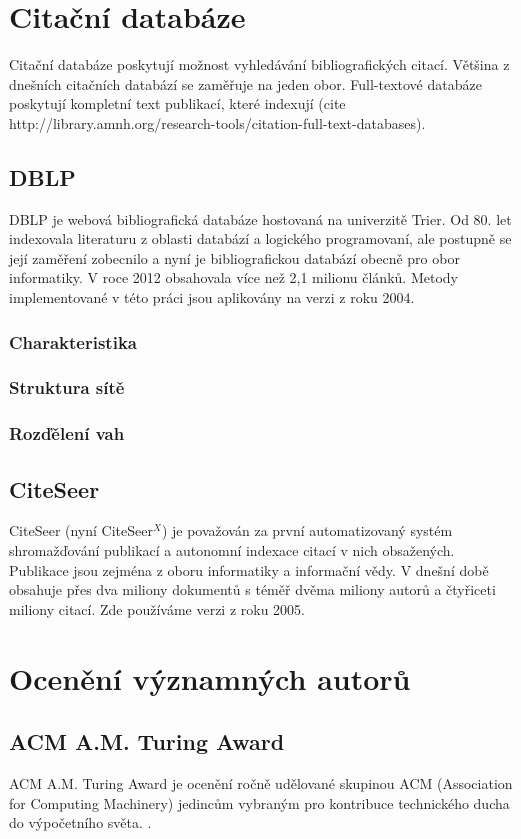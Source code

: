\documentclass[12pt,titlepage]{report}
\begin{document}
\section{Citační databáze}
Citační databáze poskytují možnost vyhledávání bibliografických citací. Většina
z dnešních citačních databází se zaměřuje na jeden obor. Full-textové databáze
poskytují kompletní text publikací, které indexují (cite
http://library.amnh.org/research-tools/citation-full-text-databases).

\subsection{DBLP}
DBLP \cite{DBLP} je webová bibliografická databáze hostovaná na univerzitě
Trier. Od 80.  let indexovala literaturu z oblasti databází a logického
programovaní, ale postupně se její zaměření zobecnilo a nyní je bibliografickou
databází obecně pro obor informatiky. V roce 2012 obsahovala více než 2,1
milionu článků. Metody implementované v této práci jsou aplikovány na verzi z
roku 2004. 

\subsubsection{Charakteristika}
\subsubsection{Struktura sítě}
\subsubsection{Rozďělení vah}

\subsection{CiteSeer}
CiteSeer (nyní CiteSeer$^X$) \cite{citeseer} je považován za první
automatizovaný systém shromažďování publikací a autonomní indexace citací v
nich obsažených. Publikace jsou zejména z oboru informatiky a informační vědy.
V dnešní době obsahuje přes dva miliony dokumentů s téměř dvěma miliony autorů
a čtyřiceti miliony citací. Zde používáme verzi z roku 2005.
\section{Ocenění významných autorů}
\subsection{ACM A.M. Turing Award}
ACM A.M. Turing Award je ocenění ročně udělované skupinou ACM (Association for
Computing Machinery) jedincům vybraným pro kontribuce technického ducha do
výpočetního světa.
\cite{turingaward}.
\end{document}
